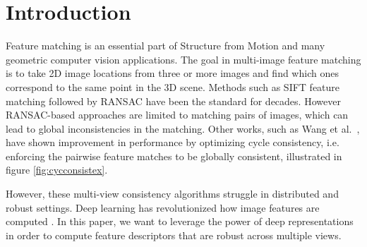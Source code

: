 \documentclass[10pt,twocolumn,letterpaper]{article}
\begin{document}
\section{Introduction}

Feature matching is an essential part of Structure from Motion and many geometric computer vision applications.
The goal in multi-image feature matching is to take 2D image locations from three or more images and find which ones correspond to the same point in the 3D scene.
Methods such as SIFT feature matching \cite{lowe2004distinctive} followed by RANSAC \cite{fischler1981random} have been the standard for decades.
However RANSAC-based approaches are limited to matching pairs of images, which can lead to global inconsistencies in the matching.
Other works, such as Wang et al.~\cite{wang2017multi}, have shown improvement in performance by optimizing cycle consistency, i.e. enforcing the pairwise feature matches to be globally consistent, illustrated in figure \ref{fig:cycconsistex}.

However, these multi-view consistency algorithms struggle in distributed and robust settings.
Deep learning has revolutionized how image features are computed \cite{yi2016lift}.
In this paper, we want to leverage the power of deep representations in order to compute feature descriptors that are robust across multiple views.
\end{document}

